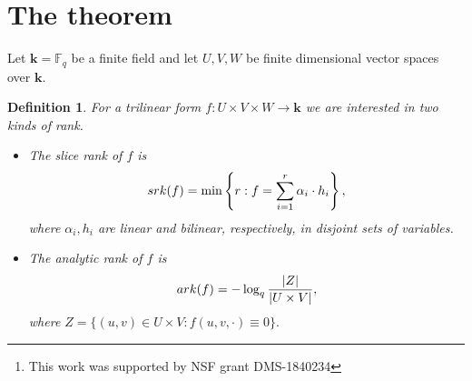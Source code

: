 \documentclass{daj}
\newtheorem{definition}[theorem]{Definition}
\renewcommand{\k}{{\mathbf{k}}}
\newcommand{\F}{\mathbb{F}}
\newcommand{\ark}{\textnormal{ark}}
\newcommand{\srk}{\textnormal{srk}}
\begin{document}
\begin{frontmatter}[classification=text]


\author[AL]{Amichai Lampert\thanks{This work was supported by NSF grant DMS-1840234}}

\begin{abstract}
In this note, we present an elementary proof of the fact that the slice rank of a trilinear form over a finite field is bounded above by a linear expression in the analytic rank. The existing proofs by Adiprasito-Kazhdan-Ziegler and Cohen-Moshkovitz both rely on results of Derksen via geometric invariant theory. A novel feature of our proof is that the linear forms appearing in the slice rank decomposition are obtained from the trilinear form by fixing coordinates.
\end{abstract}
\end{frontmatter}

\section{The theorem}
Let $\k = \F_q$ be a finite field and let $U,V,W$ be finite dimensional vector spaces over $\k.$  
\begin{definition}\label{rk-def} 
For a trilinear form $f:U\times V\times W\to\k$ we are interested in two kinds of rank.
\begin{itemize}
    \item The \emph{slice rank} of $f$ is 
    \[
    \srk(f) = \min\left\{r: f = \sum_{i=1}^r \alpha_i\cdot h_i\right\},
    \]
    where $\alpha_i,h_i$ are linear and bilinear, respectively, in disjoint sets of variables.
    \item The \emph{analytic rank} of $f$ is 
    \[
    \ark(f) = -\log_q \frac{|Z|}{|U\times V|},
    \]
    where $Z = \{(u,v)\in U\times V: f(u,v,\cdot) \equiv 0\}.$
\end{itemize}
    
\end{definition}
\end{document}
